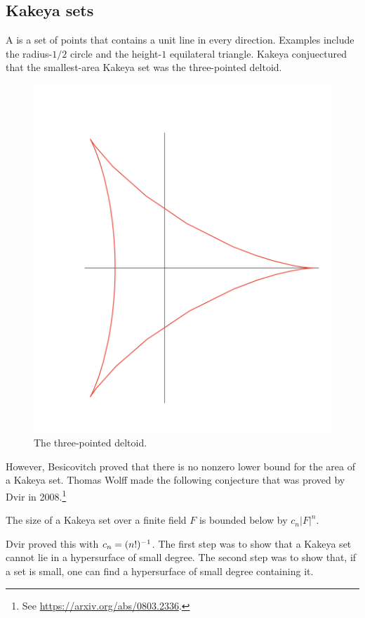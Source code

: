 \documentclass [11 pt, oneside] {article}
\begin{document}
\subsection{Kakeya sets}
A  is a set of points that contains a unit line in every direction. Examples include the radius-$1/2$ circle and the height-$1$ equilateral triangle. Kakeya conjuectured that the smallest-area Kakeya set was the three-pointed deltoid.

\begin{figure}
	\begin{center}
		\includegraphics[scale=0.4]{images/kakeya_deltoid}
		\caption{The three-pointed deltoid.}
	\end{center}
\end{figure}

However, Besicovitch proved that there is no nonzero lower bound for the area of a Kakeya set. Thomas Wolff made the following conjecture that was proved by Dvir in 2008.\footnote{See \url{https://arxiv.org/abs/0803.2336}.}
\begin{theorem}\label{}\index{}
The size of a Kakeya set over a finite field $F$ is bounded below by $c_n\left\lvert F \right\rvert ^n$.
\end{theorem}
Dvir proved this with $c_n = (n!)^{-1}$. The first step was to show that a Kakeya set cannot lie in a hypersurface of small degree. The second step was to show that, if a set is small, one can find a hypersurface of small degree containing it.
\end{document}
